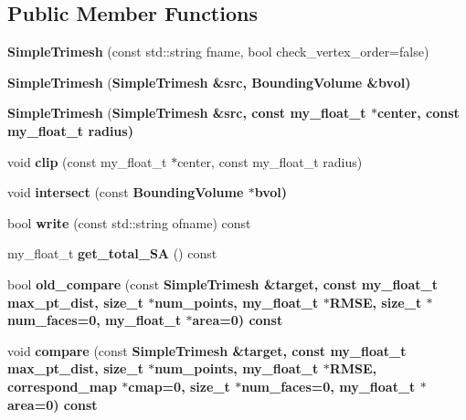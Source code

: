\subsection*{Public Member Functions}
\begin{CompactItemize}
\item 
\textbf{Simple\-Trimesh} (const std::string fname, bool check\_\-vertex\_\-order=false)\label{classASCbase_1_1SimpleTrimesh_3e3d62990f6adc85a2f7773896c92f34}

\item 
\textbf{Simple\-Trimesh} (\bf{Simple\-Trimesh} \&src, \bf{Bounding\-Volume} \&bvol)\label{classASCbase_1_1SimpleTrimesh_8abd29eec3ba76a51d59835e465a35ee}

\item 
\textbf{Simple\-Trimesh} (\bf{Simple\-Trimesh} \&src, const my\_\-float\_\-t $\ast$center, const my\_\-float\_\-t radius)\label{classASCbase_1_1SimpleTrimesh_ef4ffdf1fd937f5209f81d9f58e9b1a9}

\item 
void \textbf{clip} (const my\_\-float\_\-t $\ast$center, const my\_\-float\_\-t radius)\label{classASCbase_1_1SimpleTrimesh_6589c1db21145564e4d1e6de26e77060}

\item 
void \textbf{intersect} (const \bf{Bounding\-Volume} $\ast$bvol)\label{classASCbase_1_1SimpleTrimesh_db13b6eab9e030cf21c594f2d0613051}

\item 
bool \textbf{write} (const std::string ofname) const \label{classASCbase_1_1SimpleTrimesh_4d5fc687d60362490263ef26eade8fbb}

\item 
my\_\-float\_\-t \textbf{get\_\-total\_\-SA} () const \label{classASCbase_1_1SimpleTrimesh_fd2c1d5f6be4c731c4b64ec249f6f1ef}

\item 
bool \textbf{old\_\-compare} (const \bf{Simple\-Trimesh} \&target, const my\_\-float\_\-t max\_\-pt\_\-dist, size\_\-t $\ast$num\_\-points, my\_\-float\_\-t $\ast$RMSE, size\_\-t $\ast$num\_\-faces=0, my\_\-float\_\-t $\ast$area=0) const \label{classASCbase_1_1SimpleTrimesh_c55aa8f87f4244a93cc319220815b2c1}

\item 
void \textbf{compare} (const \bf{Simple\-Trimesh} \&target, const my\_\-float\_\-t max\_\-pt\_\-dist, size\_\-t $\ast$num\_\-points, my\_\-float\_\-t $\ast$RMSE, correspond\_\-map $\ast$cmap=0, size\_\-t $\ast$num\_\-faces=0, my\_\-float\_\-t $\ast$area=0) const \label{classASCbase_1_1SimpleTrimesh_0674ac20bbafd3d2ce88edbf010cb83b}


\end{CompactItemize}
